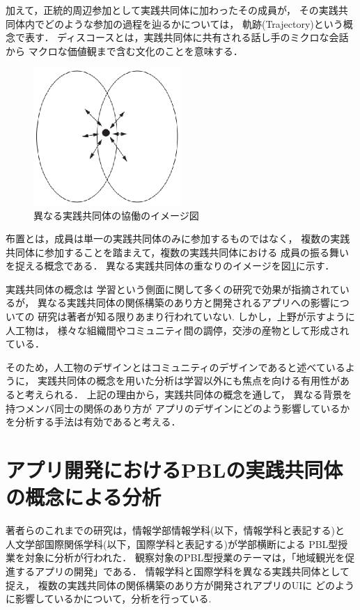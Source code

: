 \documentclass[submit,techrep]{ipsj}
\begin{document}
加えて，正統的周辺参加として実践共同体に加わったその成員が，
その実践共同体内でどのような参加の過程を辿るかについては，
軌跡(Trajectory)という概念で表す．
ディスコースとは，実践共同体に共有される話し手のミクロな会話から
マクロな価値観まで含む文化のことを意味する\cite{book10}．
\begin{figure}[h]
  \centering
  \includegraphics[width=0.5\textwidth]{img/overlap.eps}
  \caption{異なる実践共同体の協働のイメージ図}
  \label{overlap}
\end{figure}


布置とは，成員は単一の実践共同体のみに参加するものではなく，
複数の実践共同体に参加することを踏まえて，複数の実践共同体における
成員の振る舞いを捉える概念である\cite{book11}．
異なる実践共同体の重なりのイメージを図\ref{overlap}に示す．




実践共同体の概念は
学習という側面に関して多くの研究で効果が指摘されているが，
異なる実践共同体の関係構築のあり方と開発されるアプリへの影響についての
研究は著者が知る限りあまり行われていない.
しかし，上野\cite{book12}が示すように人工物は，
様々な組織間やコミュニティ間の調停，交渉の産物として形成されている．


そのため，人工物のデザインとはコミュニティのデザインであると述べているように，
実践共同体の概念を用いた分析は学習以外にも焦点を向ける有用性があると考えられる．
上記の理由から，実践共同体の概念を通して，
異なる背景を持つメンバ同士の関係のあり方が
アプリのデザインにどのよう影響しているかを分析する手法は有効であると考える．

\section{アプリ開発におけるPBLの実践共同体の概念による分析}
\label{previous-research-pbl}

著者らのこれまでの研究は，情報学部情報学科(以下，情報学科と表記する)と
人文学部国際関係学科(以下，国際学科と表記する)が学部横断による
PBL型授業を対象に分析が行われた．
観察対象のPBL型授業のテーマは，「地域観光を促進するアプリの開発」である．
情報学科と国際学科を異なる実践共同体として捉え，
複数の実践共同体の関係構築のあり方が開発されアプリのUIに
どのように影響しているかについて，分析を行っている\cite{book13}.
\end{document}
